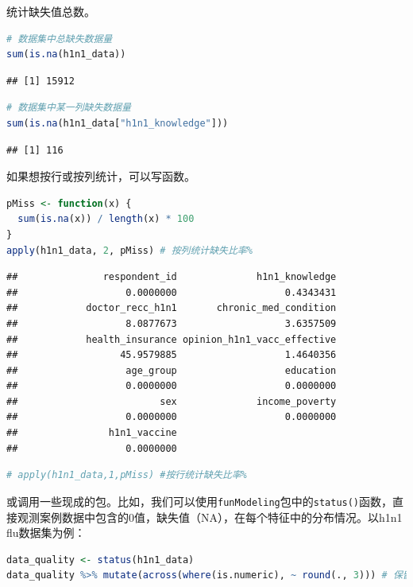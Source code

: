 \documentclass[]{ctexbook}
\newcommand{\passthrough}[1]{#1}
\begin{document}
统计缺失值总数。

\begin{lstlisting}[language=R]
# 数据集中总缺失数据量
sum(is.na(h1n1_data))
\end{lstlisting}

\begin{lstlisting}
## [1] 15912
\end{lstlisting}

\begin{lstlisting}[language=R]
# 数据集中某一列缺失数据量
sum(is.na(h1n1_data["h1n1_knowledge"]))
\end{lstlisting}

\begin{lstlisting}
## [1] 116
\end{lstlisting}

如果想按行或按列统计，可以写函数。

\begin{lstlisting}[language=R]
pMiss <- function(x) {
  sum(is.na(x)) / length(x) * 100
}
apply(h1n1_data, 2, pMiss) # 按列统计缺失比率%
\end{lstlisting}

\begin{lstlisting}
##               respondent_id              h1n1_knowledge 
##                   0.0000000                   0.4343431 
##            doctor_recc_h1n1       chronic_med_condition 
##                   8.0877673                   3.6357509 
##            health_insurance opinion_h1n1_vacc_effective 
##                  45.9579885                   1.4640356 
##                   age_group                   education 
##                   0.0000000                   0.0000000 
##                         sex              income_poverty 
##                   0.0000000                   0.0000000 
##                h1n1_vaccine 
##                   0.0000000
\end{lstlisting}

\begin{lstlisting}[language=R]
# apply(h1n1_data,1,pMiss) #按行统计缺失比率%
\end{lstlisting}

或调用一些现成的包。比如，我们可以使用\passthrough{\lstinline!funModeling!}包中的\passthrough{\lstinline!status()!}函数，直接观测案例数据中包含的0值，缺失值（NA），在每个特征中的分布情况。以h1n1 flu数据集为例：

\begin{lstlisting}[language=R]
data_quality <- status(h1n1_data)
data_quality %>% mutate(across(where(is.numeric), ~ round(., 3))) # 保留4位小数
\end{lstlisting}
\end{document}

